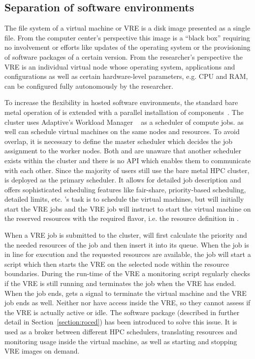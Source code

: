 \subsection{Separation of software environments}

The file system of a virtual machine or VRE is a
disk image presented as a single file. From the computer center's perspective
this image is a ``black box'' requiring no involvement or efforts like
updates of the operating system or the provisioning of software packages of a
certain version. From the researcher's perspective the VRE is an individual
virtual node whose operating system, applications and configurations
as well as certain hardware-level parameters, e.g. CPU and RAM, can be
configured fully autonomously by the researcher.


To increase the flexibility in hosted software environments, the standard bare metal
operation of \NEMO is extended with a parallel installation of \Openstack
components~\cite{hpc-symp:2016}.
The \NEMO cluster uses Adaptive's Workload Manager \Moab~\cite{Moab} as a
scheduler of compute jobs.
\Openstack as well can schedule virtual machines on the same nodes and
resources.
To avoid overlap, it is necessary to define the master scheduler
which decides the job assignment to the worker nodes.
Both \Moab and \Openstack are
unaware that another scheduler exists within the cluster and there is
no API which enables them to  communicate with each other. Since the majority of users still use the
bare metal HPC cluster, \Moab is deployed as the primary scheduler. It allows for
detailed job description and offers sophisticated scheduling features like
fair-share, priority-based scheduling, detailed limits,
etc. \Openstack 's task is to schedule the virtual machines, but \Moab will initially start the VRE
jobs and the VRE job will instruct \Openstack to start the virtual machine on the
reserved resources with the required flavor, i.e. the resource definition in \Openstack.

When a VRE job is submitted to the \NEMO cluster, \Moab will first calculate the
priority and the needed resources of the job and then insert it into its queue.
When the job is in line for execution and the requested resources are available,
the job will start a script which then starts the VRE on the selected node
within the resource boundaries. During the run-time of the VRE a monitoring
script regularly checks if the VRE is still running and terminates the job when
the VRE has ended.
When the job ends, \Openstack gets a signal to terminate the virtual machine and
the VRE job ends as well.  Neither \Moab nor \Openstack have access
inside the VRE, so they cannot assess if the VRE is actually active or
idle.
The software package \Roced (described in
further detail in Section~\ref{section:roced}) has been introduced to
solve this issue.
It is used as a broker between
different HPC schedulers,  translating resources and monitoring usage inside the
virtual machine, as well as starting and stopping VRE images on demand.
